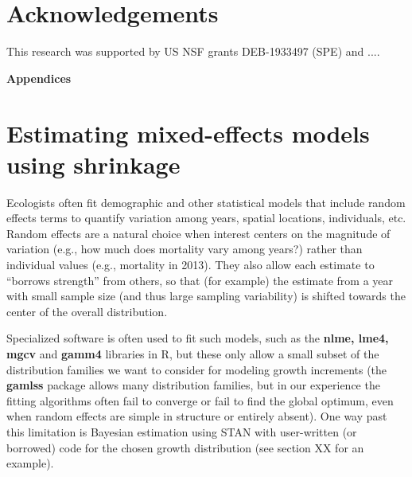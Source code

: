 \documentclass[11pt]{article}
\begin{document}
{\section*{Acknowledgements} 
This research was supported by US NSF grants DEB-1933497 (SPE) and .... 

%



\newpage 
\clearpage 
\setcounter{equation}{0}
\setcounter{figure}{0}
\setcounter{section}{0}
\setcounter{table}{0}
\setcounter{Box}{0}
\renewcommand{\theequation}{S.\arabic{equation}}
\renewcommand{\thetable}{S-\arabic{table}}
\renewcommand{\thefigure}{S-\arabic{figure}}
\renewcommand{\theBox}{S-\arabic{Box}}
\renewcommand{\thesection}{S.\arabic{section}}

\centerline{\Large{\textbf{Appendices}}}

\section{Estimating mixed-effects models using shrinkage}

Ecologists often fit demographic and other statistical models that include random effects terms to
quantify variation among years, spatial locations, individuals, etc. Random effects
are a natural choice when interest centers on the magnitude of variation (e.g., how much does mortality vary among years?)  
rather than individual values (e.g., mortality in 2013). They also allow each estimate to 
``borrows strength'' from others, so that (for example) the estimate from a year with small sample size (and thus large 
sampling variability) is shifted towards the center of the overall distribution. 

Specialized software is often used to fit such models, such as the \textbf{nlme, lme4, mgcv} and \textbf{gamm4} libraries in R,  
but these only allow a small subset of the distribution families we want to consider for modeling growth increments (the \textbf{gamlss} 
package allows many distribution families, but in our experience the fitting algorithms often fail to converge or fail to find the global optimum,
even when random effects are simple in structure or entirely absent). One way past this limitation is Bayesian estimation using STAN with
user-written (or borrowed) code for the chosen growth distribution (see section XX for an example). 

}
\end{document}
